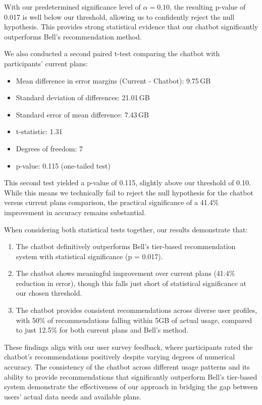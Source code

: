 \documentclass[conference]{IEEEtran}
\begin{document}
With our predetermined significance level of $\alpha = 0.10$, the resulting p-value of 0.017 is well below our threshold, allowing us to confidently reject the null hypothesis. This provides strong statistical evidence that our chatbot significantly outperforms Bell's recommendation method.

We also conducted a second paired t-test comparing the chatbot with participants' current plans:

\begin{itemize}
    \item Mean difference in error margins (Current - Chatbot): 9.75\,GB
    \item Standard deviation of differences: 21.01\,GB
    \item Standard error of mean difference: 7.43\,GB
    \item t-statistic: 1.31
    \item Degrees of freedom: 7
    \item p-value: 0.115 (one-tailed test)
\end{itemize}

This second test yielded a p-value of 0.115, slightly above our threshold of 0.10. While this means we technically fail to reject the null hypothesis for the chatbot versus current plans comparison, the practical significance of a 41.4\% improvement in accuracy remains substantial.

When considering both statistical tests together, our results demonstrate that:

\begin{enumerate}
    \item The chatbot definitively outperforms Bell's tier-based recommendation system with statistical significance (p = 0.017).
    
    \item The chatbot shows meaningful improvement over current plans (41.4\% reduction in error), though this falls just short of statistical significance at our chosen threshold.
    
    \item The chatbot provides consistent recommendations across diverse user profiles, with 50\% of recommendations falling within 5GB of actual usage, compared to just 12.5\% for both current plans and Bell's method.
\end{enumerate}

These findings align with our user survey feedback, where participants rated the chatbot's recommendations positively despite varying degrees of numerical accuracy. The consistency of the chatbot across different usage patterns and its ability to provide recommendations that significantly outperform Bell's tier-based system demonstrate the effectiveness of our approach in bridging the gap between users' actual data needs and available plans.
\end{document}
